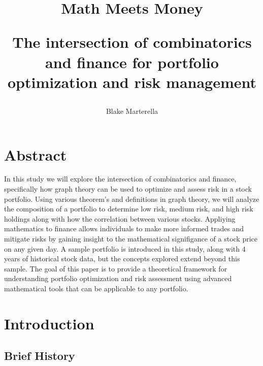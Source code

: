 \documentclass{article}
\begin{document}
\title{
 Math Meets Money \\ 
\begin{large} 
The intersection of combinatorics and finance for portfolio optimization and risk management
\end{large} }
\author{Blake Marterella}
\date{}

\maketitle

\section*{Abstract}

In this study we will explore the intersection of combinatorics and finance, specifically how graph theory can be used to optimize and assess risk in a stock portfolio. Using various theorem's and definitions in graph theory, we will analyze the composition of a portfolio to determine low risk, medium risk, and high risk holdings along with how the correlation between various stocks. Appliying mathematics to finance allows individuals to make more informed trades and mitigate risks by gaining insight to the mathematical signifigance of a stock price on any given day. A sample portfolio is introduced in this study, along with 4 years of historical stock data, but the concepts explored extend beyond this sample. The goal of this paper is to provide a theoretical framework for understanding portfolio optimization and risk assessment using advanced mathematical tools that can be applicable to any portfolio.

\tableofcontents

\section{Introduction}

\subsection{Brief History}
\end{document}
